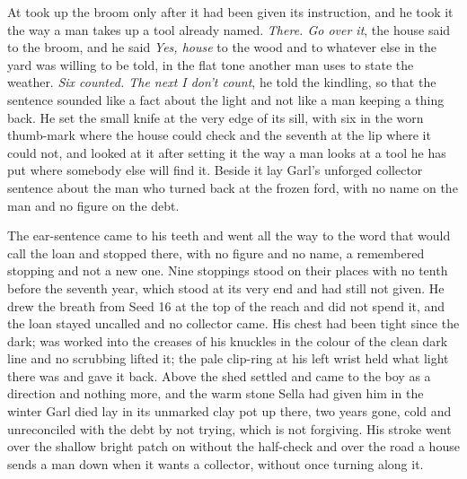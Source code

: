 \scenebreak

At   took up the broom only after it had been given its instruction, and he took it the way a man takes up a tool already named. \emph{There. Go over it}, the house said to the broom, and he said \emph{Yes, house} to the wood and to whatever else in the yard was willing to be told, in the flat tone another man uses to state the weather. \emph{Six counted. The next I don't count}, he told the kindling, so that the sentence sounded like a fact about the light and not like a man keeping a thing back. He set the small knife at the very edge of its sill, with six in the worn thumb-mark where the house could check and the seventh at the lip where it could not, and looked at it after setting it the way a man looks at a tool he has put where somebody else will find it. Beside it lay Garl's unforged collector sentence about the man who turned back at the frozen ford, with no name on the man and no figure on the debt.

The ear-sentence came to his teeth and went all the way to the word that would call the loan and stopped there, with no figure and no name, a remembered stopping and not a new one. Nine stoppings stood on their places with no tenth before the seventh year, which stood at its very end and had still not given. He drew the breath from Seed 16 at the top of the reach and did not spend it, and the loan stayed uncalled and no collector came. His chest had been tight since the dark;  was worked into the creases of his knuckles in the colour of the clean dark line and no scrubbing lifted it; the pale clip-ring at his left wrist held what light there was and gave it back. Above the shed  settled and came to the boy as a direction and nothing more, and the warm stone Sella had given him in the winter Garl died lay in its unmarked clay pot up there, two years gone, cold and unreconciled with the debt by not trying, which is not forgiving. His stroke went over the shallow bright patch on  without the half-check and over the road a house sends a man down when it wants a collector, without once turning along it.

\scenebreak

